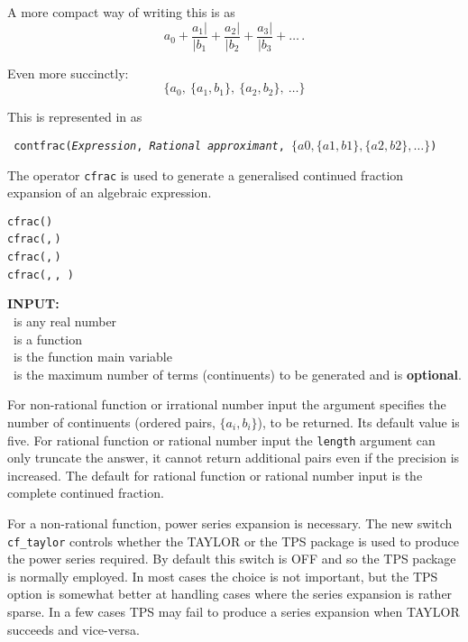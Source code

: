 A more compact way of writing this is as
\[a_0 + \frac{a_1|}{|b_1} + \frac{a_2|}{|b_2} + \frac{a_3|}{|b_3} + \ldots\,.\]

Even more succinctly:
\[\{a_0,\ \{a_1, b_1\},\ \{a_2, b_2\},\ \ldots\}\]

%
This is represented in {\REDUCE} as
\begin{center}\tt
  contfrac(\textsl{Expression},
    \textsl{Rational approximant},
                $\{a0, \{a1,b1\}, \{a2,b2\}, \dots\}$)
\end{center}

\hypertarget{operator:CFRAC}{}
The operator \texttt{cfrac}
is used to generate a generalised continued
fraction expansion of an algebraic expression.

\begin{syntaxtable}
  \texttt{cfrac(}\texttt{)}\\
  \texttt{cfrac(}\texttt{,}\,\texttt{)}\\
  \texttt{cfrac(}\texttt{,}\,\texttt{)}\\
  \texttt{cfrac(}\texttt{,}\,\texttt{,}\,%
  \texttt{)}
\end{syntaxtable}


\textbf{INPUT:}\\
 \ is any real number\\
 \ is a function\\
 \ is the function main variable\\
 \ is the maximum number of terms (continuents) to be
generated and is \textbf{optional}.

For non-rational function or irrational number input the 
argument specifies the number of continuents (ordered pairs, $\{a_i,b_i\}$),
to be returned. Its default value is five.
For rational function or rational number input the
\texttt{length} argument can only truncate the answer, it cannot
return additional pairs even if the precision is increased.
The default for rational function or rational number input is the
complete continued fraction.

\hypertarget{switch:CF_TAYLOR}{}

For a non-rational function, power series expansion is necessary. The new
switch \texttt{cf\_taylor} controls whether the TAYLOR or the TPS package is
used to produce the power series required. By default this switch is OFF and
so the TPS package is normally employed.
In most cases the choice is not important, but the TPS option is somewhat
better at handling cases where the series expansion is rather sparse.
In a few cases TPS may fail to produce a series expansion when TAYLOR succeeds
and vice-versa.

